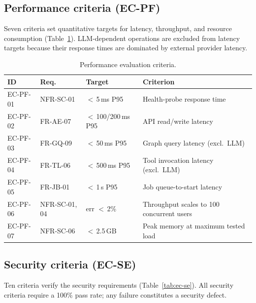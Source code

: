 \documentclass[a4paper]{sapthesis}
\begin{document}
\subsection{Performance criteria (EC-PF)}

Seven criteria set quantitative targets for latency, throughput, and
resource consumption (Table~\ref{tab:ec-pf}).  LLM-dependent operations
are excluded from latency targets because their response times are
dominated by external provider latency.

\begin{table}[ht]
\centering
\caption{Performance evaluation criteria.}
\label{tab:ec-pf}
\small
\begin{tabularx}{\textwidth}{@{}l l l X@{}}
    \hline
    \textbf{ID} & \textbf{Req.} & \textbf{Target} &
        \textbf{Criterion} \\
    \hline
    EC-PF-01 & NFR-SC-01 & $<$\,5\,ms P95 &
        Health-probe response time \\
    EC-PF-02 & FR-AE-07 & $<$\,100/200\,ms P95 &
        API read/write latency \\
    EC-PF-03 & FR-GQ-09 & $<$\,50\,ms P95 &
        Graph query latency (excl.\ LLM) \\
    EC-PF-04 & FR-TL-06 & $<$\,500\,ms P95 &
        Tool invocation latency (excl.\ LLM) \\
    EC-PF-05 & FR-JB-01 & $<$\,1\,s P95 &
        Job queue-to-start latency \\
    EC-PF-06 & NFR-SC-01, 04 & err $<$\,2\% &
        Throughput scales to 100 concurrent users \\
    EC-PF-07 & NFR-SC-06 & $<$\,2.5\,GB &
        Peak memory at maximum tested load \\
    \hline
\end{tabularx}
\end{table}

\subsection{Security criteria (EC-SE)}

Ten criteria verify the security requirements
(Table~\ref{tab:ec-se}).  All security criteria require a 100\% pass
rate; any failure constitutes a security defect.
\end{document}
